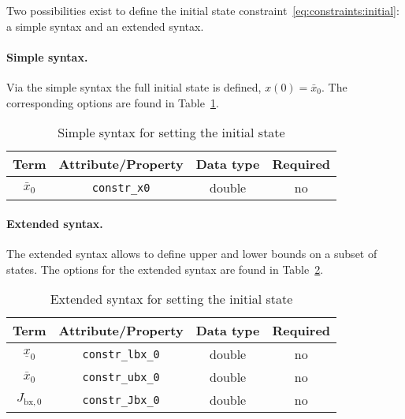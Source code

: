 \documentclass[english]{article}
\newcommand{\code}[1]{\texttt{#1}}
\newcommand{\optional}{no}
\begin{document}
Two possibilities exist to define the initial state constraint~\eqref{eq:constraints:initial}: a simple syntax and an extended syntax.

\paragraph{Simple syntax.}
Via the simple syntax the full initial state is defined, $x(0)=\bar{x}_0$.
The corresponding options are found in Table~\ref{tab:constraints:simplesyntax}.
\begin{table}[ht!]
    \centering
    \caption{Simple syntax for setting the initial state} \label{tab:constraints:simplesyntax}
    \begin{tabular}{cccc}
        \toprule
        Term & Attribute/Property & Data type & Required \\ \midrule
        $ \bar{x}_0 $ & \code{constr\_x0} & double & \optional \\
        \bottomrule
    \end{tabular}
\end{table}
%
\paragraph{Extended syntax.}
The extended syntax allows to define upper and lower bounds on a subset of states.
The options for the extended syntax are found in Table~\ref{tab:constraints:extendedsyntax}.
\begin{table}[ht!]
    \centering
    \caption{Extended syntax for setting the initial state} \label{tab:constraints:extendedsyntax}
    \begin{tabular}{cccc}
        \toprule
        Term & Attribute/Property & Data type & Required \\ \midrule
        $ \underline{x}_0 $ & \code{constr\_lbx\_0} & double & \optional \\
        $ \bar{x}_0 $ & \code{constr\_ubx\_0} & double & \optional \\
        $ J_{\textrm{bx},0} $ & \code{constr\_Jbx\_0} & double & \optional \\
        \bottomrule
    \end{tabular}
\end{table}
%
\end{document}
